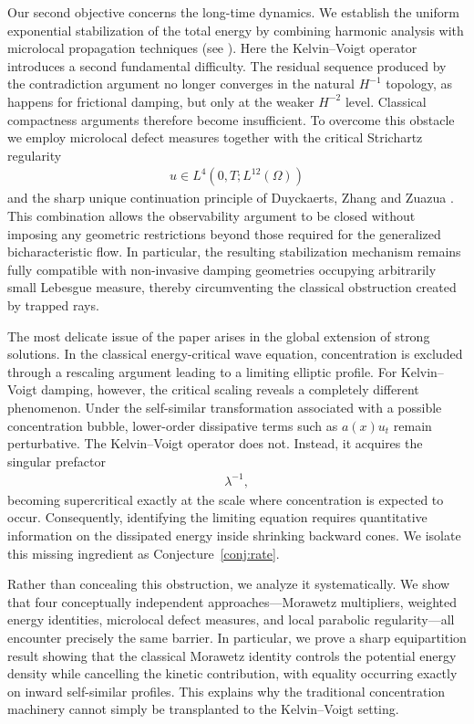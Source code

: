 \documentclass[11pt,letterpaper]{amsart}
\begin{document}
Our second objective concerns the long-time dynamics. We establish the uniform exponential stabilization of the total energy by combining harmonic analysis with microlocal propagation techniques (see \cite{Gerard}). Here the Kelvin--Voigt operator introduces a second fundamental difficulty. The residual sequence produced by the contradiction argument no longer converges in the natural $H^{-1}$ topology, as happens for frictional damping, but only at the weaker $H^{-2}$ level. Classical compactness arguments therefore become insufficient. To overcome this obstacle we employ microlocal defect measures together with the critical Strichartz regularity
\begin{eqnarray*}
u\in L^4(0,T;L^{12}(\Omega))
\end{eqnarray*}
and the sharp unique continuation principle of Duyckaerts, Zhang and Zuazua \cite{Duyckaerts}. This combination allows the observability argument to be closed without imposing any geometric restrictions beyond those required for the generalized bicharacteristic flow. In particular, the resulting stabilization mechanism remains fully compatible with non-invasive damping geometries occupying arbitrarily small Lebesgue measure, thereby circumventing the classical obstruction created by trapped rays.

The most delicate issue of the paper arises in the global extension of strong solutions. In the classical energy-critical wave equation, concentration is excluded through a rescaling argument leading to a limiting elliptic profile. For Kelvin--Voigt damping, however, the critical scaling reveals a completely different phenomenon. Under the self-similar transformation associated with a possible concentration bubble, lower-order dissipative terms such as $a(x)u_t$ remain perturbative. The Kelvin--Voigt operator does not. Instead, it acquires the singular prefactor
\begin{eqnarray*}
\lambda^{-1},
\end{eqnarray*}
becoming supercritical exactly at the scale where concentration is expected to occur. Consequently, identifying the limiting equation requires quantitative information on the dissipated energy inside shrinking backward cones. We isolate this missing ingredient as Conjecture~\ref{conj:rate}.

Rather than concealing this obstruction, we analyze it systematically. We show that four conceptually independent approaches---Morawetz multipliers, weighted energy identities, microlocal defect measures, and local parabolic regularity---all encounter precisely the same barrier. In particular, we prove a sharp equipartition result showing that the classical Morawetz identity controls the potential energy density while cancelling the kinetic contribution, with equality occurring exactly on inward self-similar profiles. This explains why the traditional concentration machinery cannot simply be transplanted to the Kelvin--Voigt setting.
\end{document}
